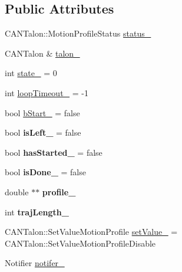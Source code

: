 \subsection*{Public Attributes}
\begin{DoxyCompactItemize}
\item 
C\+A\+N\+Talon\+::\+Motion\+Profile\+Status \hyperlink{class_motion_profile_executor_ab99b425d2adf9904079634fd61e10b96}{status\+\_\+}
\item 
C\+A\+N\+Talon \& \hyperlink{class_motion_profile_executor_af9d5579de49093673fac4e35819e7e0f}{talon\+\_\+}
\item 
int \hyperlink{class_motion_profile_executor_af971a9eb8807ea12c7d70befe44d2122}{state\+\_\+} = 0
\item 
int \hyperlink{class_motion_profile_executor_aba6cb888640b9bb7c169e1bf33de92b3}{loop\+Timeout\+\_\+} = -\/1
\item 
bool \hyperlink{class_motion_profile_executor_a60632854bbae77815fbafa3b8c1450e7}{b\+Start\+\_\+} = false
\item 
\mbox{\label{class_motion_profile_executor_aef583c74fa3c313e758b5f3c1b48ae53}} 
bool {\bfseries is\+Left\+\_\+} = false
\item 
\mbox{\label{class_motion_profile_executor_ade8df55aeb5c88635782f7e2ccf473ca}} 
bool {\bfseries has\+Started\+\_\+} = false
\item 
\mbox{\label{class_motion_profile_executor_ae973dbde77522dae4166e039fb3f646e}} 
bool {\bfseries is\+Done\+\_\+} = false
\item 
\mbox{\label{class_motion_profile_executor_a46c706826d1b78146e340947696e5232}} 
double $\ast$$\ast$ {\bfseries profile\+\_\+}
\item 
\mbox{\label{class_motion_profile_executor_a05e5a41867c021b9ff7c9f7c72ad5d46}} 
int {\bfseries traj\+Length\+\_\+}
\item 
C\+A\+N\+Talon\+::\+Set\+Value\+Motion\+Profile \hyperlink{class_motion_profile_executor_a34d9e17b3cdf0ad0a117cc2cc995e85f}{set\+Value\+\_\+} = C\+A\+N\+Talon\+::\+Set\+Value\+Motion\+Profile\+Disable
\item 
Notifier \hyperlink{class_motion_profile_executor_a01ac4918310bd4207fa361ee66124602}{notifer\+\_\+}
\end{DoxyCompactItemize}
